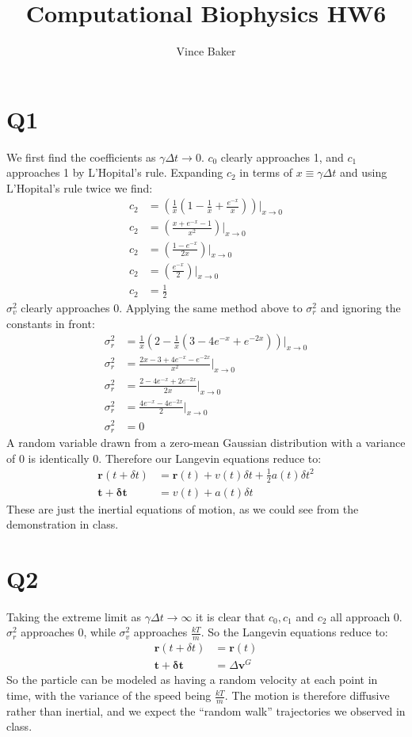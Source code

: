 \documentclass[a4paper,11pt]{article}
\title{Computational Biophysics HW6}
\author{Vince Baker}
\numberwithin{equation}{section}
\newcommand{\bv}[1]{\mathbf{#1}}
\newcommand{\lrp}[1]{\left({#1}\right)}
\begin{document}
\maketitle

\section{Q1}
We first find the coefficients as $\gamma\Delta t \rightarrow 0$.
$c_0$ clearly approaches 1, and $c_1$ approaches 1 by L'Hopital's rule.
Expanding $c_2$ in terms of $x \equiv \gamma\Delta t$ and using L'Hopital's rule twice we find:
\begin{align}
 c_2 &= \lrp{\frac{1}{x}\lrp{1-\frac{1}{x}+\frac{e^{-x}}{x}}}|_{x\rightarrow 0}\\
 c_2 &= \lrp{\frac{x+e^{-x}-1}{x^2}}|_{x\rightarrow 0}\\
 c_2 &= \lrp{\frac{1-e^{-x}}{2x}}|_{x\rightarrow 0}\\
 c_2 &= \lrp{\frac{e^{-x}}{2}}|_{x\rightarrow 0}\\
 c_2 &= \frac{1}{2}
\end{align}
$\sigma^2_v$ clearly approaches 0. 
Applying the same method above to $\sigma^2_r$ and ignoring the constants in front:
\begin{align}
 \sigma^2_r &= \frac{1}{x}\lrp{2-\frac{1}{x}(3-4e^{-x}+e^{-2x})}|_{x\rightarrow 0}\\
 \sigma^2_r &= \frac{2x-3+4e^{-x}-e^{-2x}}{x^2}|_{x\rightarrow 0}\\
 \sigma^2_r &= \frac{2-4e^{-x}+2e^{-2x}}{2x}|_{x\rightarrow 0}\\
 \sigma^2_r &= \frac{4e^{-x}-4e^{-2x}}{2}|_{x\rightarrow 0}\\
 \sigma^2_r &= 0
\end{align}
A random variable drawn from a zero-mean Gaussian distribution with a variance of 0 is identically 0.
Therefore our Langevin equations reduce to:
\begin{align}
 \bv{r}(t+\delta t) &= \bv{r}(t) + v(t)\delta t + \frac{1}{2}a(t)\delta t^2\\
 \bv{t+\delta t} &= v(t) + a(t)\delta t
\end{align}
These are just the inertial equations of motion, as we could see from the demonstration in class.

\section{Q2}
Taking the extreme limit as $\gamma\Delta t\rightarrow\infty$ it is clear that $c_0,c_1$ and $c_2$ all approach 0.
$\sigma^2_r$ approaches 0, while $\sigma^2_v$ approaches $\frac{kT}{m}$. 
So the Langevin equations reduce to:
\begin{align}
 \bv{r}(t+\delta t) &= \bv{r}(t)\\
 \bv{t+\delta t} &= \Delta\bv{v}^G
\end{align}
So the particle can be modeled as having a random velocity at each point in time, with the variance of the speed being $\frac{kT}{m}$.
The motion is therefore diffusive rather than inertial, and we expect the ``random walk'' trajectories we observed in class.
\end{document}
